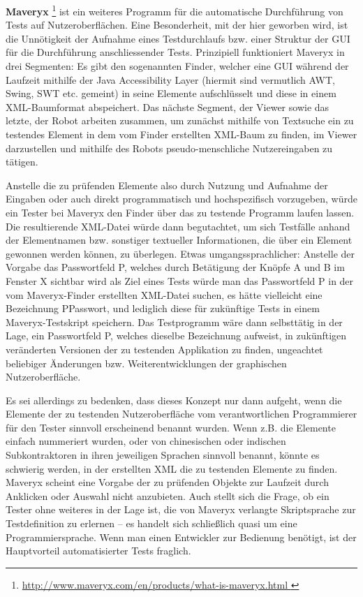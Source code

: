 \textbf{Maveryx} \footnote{\url{ http://www.maveryx.com/en/products/what-is-maveryx.html }} 
ist ein weiteres Programm für die automatische Durchführung von Tests auf Nutzeroberflächen.
Eine Besonderheit, mit der hier geworben wird, ist die Unnötigkeit der Aufnahme
eines Testdurchlaufs bzw. einer Struktur der GUI für die Durchführung anschliessender
Tests. Prinzipiell funktioniert Maveryx in drei Segmenten: Es gibt den sogenannten
\glqq{}Finder\grqq{}, welcher eine GUI während der Laufzeit mithilfe der
\glqq{}Java Accessibility Layer\grqq{} (hiermit sind vermutlich AWT, Swing, SWT etc. gemeint)
in seine Elemente aufschlüsselt und diese in einem XML-Baumformat abspeichert.
Das nächste Segment, der \glqq{}Viewer\grqq{} sowie das letzte, der \glqq{}Robot\grqq{}
arbeiten zusammen, um zunächst mithilfe von Textsuche ein zu testendes Element in
dem vom Finder erstellten XML-Baum zu finden, im Viewer darzustellen und mithilfe
des Robots pseudo-menschliche Nutzereingaben zu tätigen.

Anstelle die zu prüfenden Elemente also durch Nutzung und Aufnahme der Eingaben
oder auch direkt programmatisch und hochspezifisch vorzugeben, würde ein Tester bei
Maveryx den Finder über das zu testende Programm laufen lassen. Die resultierende
XML-Datei würde dann begutachtet, um sich Testfälle anhand der Elementnamen bzw. sonstiger
textueller Informationen, die über ein Element gewonnen werden können, zu überlegen.
Etwas umgangssprachlicher: Anstelle der Vorgabe \glqq{}das Passwortfeld P, welches
durch Betätigung der Knöpfe A und B im Fenster X sichtbar wird\grqq{} als Ziel
eines Tests würde man das Passwortfeld P in der vom Maveryx-Finder erstellten
XML-Datei suchen, es hätte vielleicht eine Bezeichnung \glqq{}PPasswort\grqq{},
und lediglich diese für zukünftige Tests in einem Maveryx-Testskript speichern.
Das Testprogramm wäre dann selbsttätig in der Lage, ein Passwortfeld P,
welches dieselbe Bezeichnung aufweist, in zukünftigen veränderten Versionen
der zu testenden Applikation zu finden, ungeachtet beliebiger Änderungen bzw.
Weiterentwicklungen der graphischen Nutzeroberfläche.

Es sei allerdings zu bedenken, dass dieses Konzept nur dann aufgeht, wenn
die Elemente der zu testenden Nutzeroberfläche vom verantwortlichen Programmierer
für den Tester sinnvoll erscheinend benannt wurden. Wenn z.B. die Elemente
einfach nummeriert wurden, oder von chinesischen oder indischen Subkontraktoren
in ihren jeweiligen Sprachen sinnvoll benannt, könnte es schwierig werden,
in der erstellten XML die zu testenden Elemente zu finden. Maveryx scheint
eine Vorgabe der zu prüfenden Objekte zur Laufzeit durch Anklicken oder
Auswahl nicht anzubieten. Auch stellt sich die Frage, ob ein Tester ohne weiteres
in der Lage ist, die von Maveryx verlangte Skriptsprache zur Testdefinition
zu erlernen -- es handelt sich schließlich quasi um eine Programmiersprache.
Wenn man einen Entwickler zur Bedienung benötigt, ist der Hauptvorteil
automatisierter Tests fraglich.

